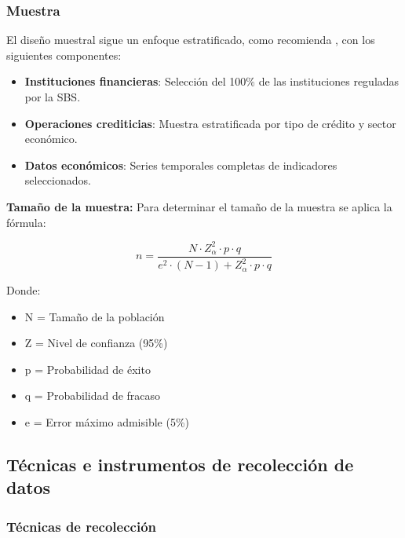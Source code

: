 \documentclass[12pt, a4paper]{article}
\begin{document}
\subsubsection{Muestra}
El diseño muestral sigue un enfoque estratificado, como recomienda \textcite{Cochran2023}, con los siguientes componentes:

\begin{itemize}
    \item \textbf{Instituciones financieras}: Selección del 100\% de las instituciones reguladas por la SBS.
    \item \textbf{Operaciones crediticias}: Muestra estratificada por tipo de crédito y sector económico.
    \item \textbf{Datos económicos}: Series temporales completas de indicadores seleccionados.
\end{itemize}

\textbf{Tamaño de la muestra:}
Para determinar el tamaño de la muestra se aplica la fórmula:

\[n = \frac{N \cdot Z_\alpha^2 \cdot p \cdot q}{e^2 \cdot (N-1) + Z_\alpha^2 \cdot p \cdot q}\]

Donde:
\begin{itemize}
    \item N = Tamaño de la población
    \item Z = Nivel de confianza (95\%)
    \item p = Probabilidad de éxito
    \item q = Probabilidad de fracaso
    \item e = Error máximo admisible (5\%)
\end{itemize}

\subsection{Técnicas e instrumentos de recolección de datos}

\subsubsection{Técnicas de recolección}
\end{document}
